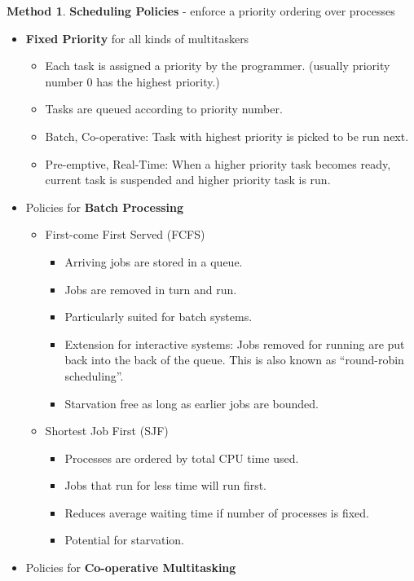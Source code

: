 \documentclass[12pt,a4paper]{article}
\theoremstyle{definition}
\newtheorem{method}{Method}[section]
\newenvironment{myitemize}
{ \begin{itemize}
    \setlength{\itemsep}{5pt}
    \setlength{\parskip}{0pt}
    \setlength{\parsep}{0pt}     }
{ \end{itemize}                  }
\begin{document}
\begin{method}{\textbf{Scheduling Policies} - enforce a priority ordering over processes}
	\begin{myitemize}
		\item \textbf{Fixed Priority} for all kinds of multitaskers
		\begin{myitemize}
			\item Each task is assigned a priority by the programmer. (usually priority number 0 has the highest priority.)
			\item Tasks are queued according to priority number.
			\item Batch, Co-operative: Task with highest priority is picked to be run next.
			\item Pre-emptive, Real-Time: When a higher priority task becomes ready, current task is suspended and higher priority task is run.
		\end{myitemize}
		\item Policies for \textbf{Batch Processing}
		\begin{myitemize}
			\item First-come First Served (\textsf{FCFS})
			\begin{myitemize}
				\item Arriving jobs are stored in a queue.
				\item Jobs are removed in turn and run.
				\item Particularly suited for batch systems.
				\item Extension for interactive systems: Jobs removed for running are put back into the back of the queue. This is also known as “round-robin scheduling”.
				\item Starvation free as long as earlier jobs are bounded.
			\end{myitemize}
			\item Shortest Job First (\textsf{SJF})
			\begin{myitemize}
				\item Processes are ordered by total CPU time used.
				\item Jobs that run for less time will run first.
				\item Reduces average waiting time if number of processes is fixed.
				\item Potential for starvation.
			\end{myitemize}
		\end{myitemize}
		\item Policies for \textbf{Co-operative Multitasking}

\end{myitemize}
\end{method}
\end{document}
